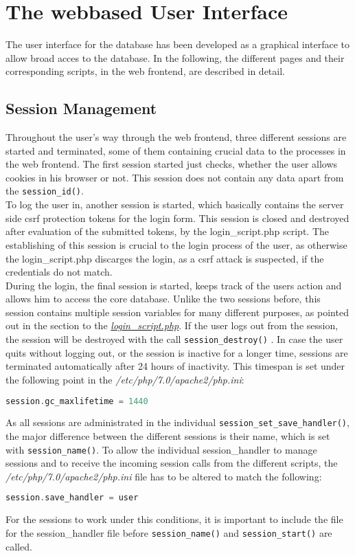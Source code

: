 
\section{The webbased User Interface}
The user interface for the database has been developed as a graphical interface to allow broad acces to the database. In the following, the different pages and their corresponding 
scripts, in the web frontend, are described in detail.

\subsection{Session Management}
Throughout the user's way through the web frontend, three different sessions are started and terminated, some of them containing crucial data to the processes in the web frontend. 
The first session started just checks, whether the user allows cookies in his browser or not. This session does not contain any data apart from the \texttt{session\_id()}.\\
To log the user in, another session is started, which basically contains the server side csrf protection tokens for the login form. This session is closed and destroyed after 
evaluation of the submitted tokens, by the login\_script.php script. The establishing of this session is crucial to the login process of the user, as otherwise the login\_script.php 
discarges the login, as a csrf attack is suspected, if the credentials do not match.\\
During the login, the final session is started, keeps track of the users action and allows him to access the core database. Unlike the two sessions before, this session contains 
multiple session variables for many different purposes, as pointed out in the section to the \hyperref[login_script]{\textit{login\_script.php}}. If the user logs out from the 
session, the session will be destroyed with the call \texttt{session\_destroy()} . In case the user quits without logging out, or the session is inactive for a longer time, sessions are 
terminated automatically after 24 hours of inactivity. This timespan is set under the following point in the \emph{/etc/php/7.0/apache2/php.ini}:
\begin{lstlisting}[language=php]
 session.gc_maxlifetime = 1440
\end{lstlisting}
As all sessions are administrated in the individual \texttt{session\_set\_save\_handler()}, the major difference between the different sessions is their name, which is set with 
\texttt{session\_name()}. To allow the individual session\_handler to manage sessions and to receive the incoming session calls from the different scripts, the 
\emph{/etc/php/7.0/apache2/php.ini} file has to be altered to match the following:
\begin{lstlisting}[language=php]
session.save_handler = user
\end{lstlisting}
For the sessions to work under this conditions, it is important to include the file for the session\_handler file before \texttt{session\_name()} and \texttt{session\_start()} 
are called.

